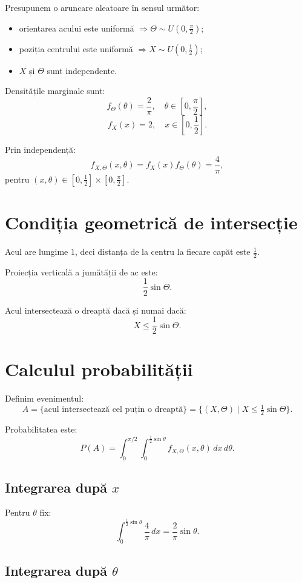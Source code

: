 \documentclass[12pt]{article}
\begin{document}
Presupunem o aruncare aleatoare în sensul următor:

\begin{itemize}
  \item orientarea acului este uniformă $\Rightarrow \Theta \sim U\left(0,\frac{\pi}{2}\right)$;
  \item poziția centrului este uniformă $\Rightarrow X \sim U\left(0,\frac{1}{2}\right)$;
  \item $X$ și $\Theta$ sunt independente.
\end{itemize}

Densitățile marginale sunt:
\[
f_\Theta(\theta) = \frac{2}{\pi}, \quad \theta \in \left[0,\frac{\pi}{2}\right],
\]
\[
f_X(x) = 2, \quad x \in \left[0,\frac{1}{2}\right].
\]

Prin independență:
\[
f_{X,\Theta}(x,\theta) = f_X(x) f_\Theta(\theta) = \frac{4}{\pi},
\]
pentru $(x,\theta)\in\left[0,\frac{1}{2}\right]\times\left[0,\frac{\pi}{2}\right]$.

\section{Condiția geometrică de intersecție}

Acul are lungime $1$, deci distanța de la centru la fiecare capăt este $\frac{1}{2}$.

Proiecția verticală a jumătății de ac este:
\[
\frac{1}{2}\sin\Theta.
\]

Acul intersectează o dreaptă dacă și numai dacă:
\[
X \le \frac{1}{2}\sin\Theta.
\]

\section{Calculul probabilității}

Definim evenimentul:
\[
A = \{\text{acul intersectează cel puțin o dreaptă}\}
= \{(X,\Theta) \mid X \le \tfrac{1}{2}\sin\Theta\}.
\]

Probabilitatea este:
\[
P(A) = \int_0^{\pi/2} \int_0^{\frac{1}{2}\sin\theta}
f_{X,\Theta}(x,\theta)\,dx\,d\theta.
\]

\subsection{Integrarea după $x$}

Pentru $\theta$ fix:
\[
\int_0^{\frac{1}{2}\sin\theta} \frac{4}{\pi}\,dx
= \frac{2}{\pi}\sin\theta.
\]

\subsection{Integrarea după $\theta$}
\end{document}

